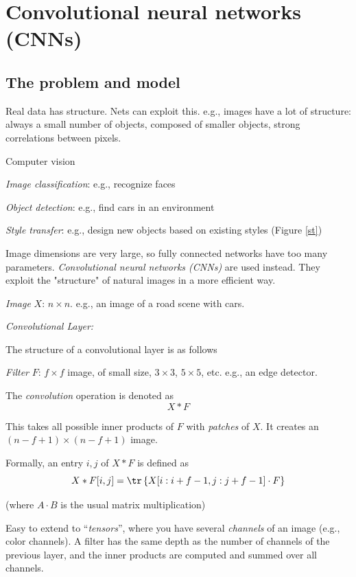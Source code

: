 \documentclass[english]{article}
\begin{document}
\eenum 


\section{Convolutional neural networks (CNNs)}
\subsection{The problem and model}
\benum
\item Real data has structure. Nets can exploit this. e.g., images have a lot of structure: always a small number of objects, composed of smaller objects, strong correlations between pixels. 


Computer vision
\benum
\item \emph{Image classification}: e.g., recognize faces 
\item \emph{Object detection}: e.g., find cars in an environment
\item \emph{Style transfer}: e.g., design new objects based on existing styles (Figure \ref{st})

\eenum
Image dimensions are very large, so fully connected networks have too many parameters. \emph{Convolutional neural networks (CNNs)} are used instead. They exploit the "structure" of natural images in a more efficient way. 

\item \emph{Image} $X$: $n\times n$. e.g., an image of a road scene with cars.

\item \emph{Convolutional Layer:} 


The structure of a convolutional layer is as follows

\benum 
\item 
\emph{Filter} $F$: $ f\times f$ image, of small size, $3 \times 3$, $5 \times 5$, etc. e.g., an edge detector.

The \emph{convolution} operation is denoted as 
$$X * F$$

This takes all possible inner products of $F$ with \emph{patches} of $X$. It creates an $(n-f+1) \times (n-f+1)$ image.

Formally, an entry $i,j$ of $X * F$ is defined as $$X * F[i,j]=\tr \left\{X[i:i+f-1,j:j+f-1] \cdot F \right\}$$ 

(where $A\cdot B$ is the usual matrix multiplication)

Easy to extend to ``\emph{tensors}'', where you have several \emph{channels} of an image (e.g., color channels). A filter has the same depth as the number of channels of the previous layer, and the inner products are computed and summed over all channels.
\end{document}
